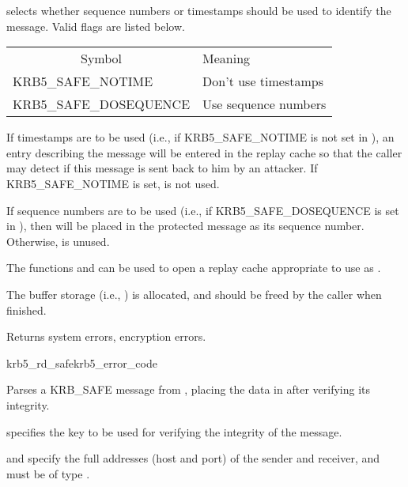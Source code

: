  selects whether sequence numbers or timestamps
should be used to identify the message.  Valid flags are listed below.

\begin{tabular}{ll}
\multicolumn{1}{c}{Symbol} & Meaning \\
KRB5_SAFE_NOTIME		& Don't use timestamps \\
KRB5_SAFE_DOSEQUENCE	& Use sequence numbers \\
\end{tabular}

If timestamps are to be used (i.e., if KRB5_SAFE_NOTIME is not set in
), an entry
describing the message will be entered in the replay cache
 so that the caller may detect if this message is sent
back to him by an attacker.  If KRB5_SAFE_NOTIME is set,
 is not used.

If sequence numbers are to be used (i.e., if KRB5_SAFE_DOSEQUENCE is
set in ), then  will be
placed in the protected message as its sequence number.  Otherwise,
 is unused.

The functions  and
 can be used to open a replay cache
appropriate to use as .

The  buffer storage (i.e.,
) is allocated, and should be freed by
the caller when finished.

Returns system errors, encryption errors.

\begin{funcdecl}{krb5_rd_safe}{krb5_error_code}{\funcin}
\funcinout
{}
\funcout
{}
\end{funcdecl}

Parses a KRB_SAFE message from , placing the
data in  after verifying its integrity.

 specifies the key to be used for verifying the
integrity of the message.
 
 and  specify the full
addresses (host and port) of the sender and receiver, and must be of
type .  

